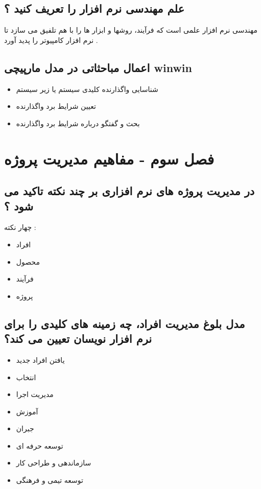 \documentclass{article}
\begin{document}
\subsection{علم مهندسی نرم افزار را تعریف کنید ؟}
مهندسی نرم افزار علمی است که فرآیند، روشها و ابزار ها را با هم تلفیق می سازد تا نرم افزار کامپیوتر را پدید آورد . 




\subsection{اعمال مباحثاتی در مدل مارپیچی winwin}

\begin{itemize}
	\item شناسایی واگذارنده کلیدی سیستم یا زیر سیستم
	\item تعیین شرایط برد واگذارنده
	\item بحث و گفتگو درباره شرایط برد واگذارنده
\end{itemize}



\section{فصل سوم - مفاهیم مدیریت پروژه}

\subsection{در مدیریت پروژه های نرم افزاری بر چند نکته تاکید می شود ؟}

چهار نکته : 

\begin{itemize}
	\item افراد
	\item محصول
	\item فرآیند
	\item پروژه
\end{itemize}




\subsection{مدل بلوغ مدیریت افراد، چه زمینه های کلیدی را برای نرم افزار نویسان تعیین می کند؟}

\begin{itemize}
	\item یافتن افراد جدید
	\item انتخاب
	\item مدیریت اجرا
	\item آموزش
	\item جبران
	\item توسعه حرفه ای
	\item سازماندهی و طراحی کار
	\item توسعه تیمی و فرهنگی
\end{itemize}
\end{document}
